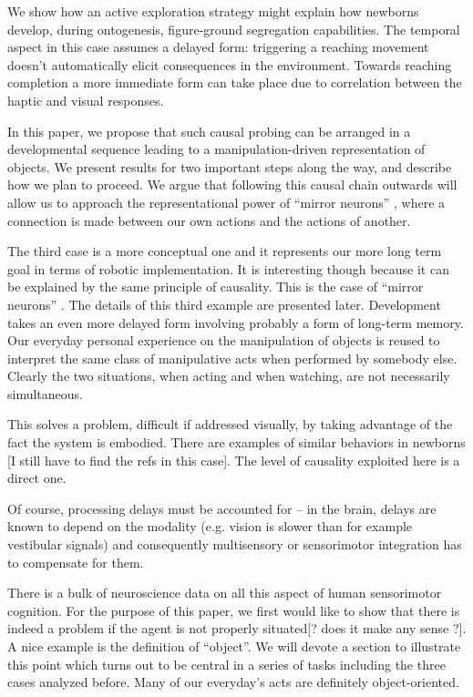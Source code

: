 We
show how an active exploration strategy might explain how newborns
develop, during ontogenesis, figure-ground segregation capabilities.
The temporal aspect in this case assumes a delayed form: triggering a
reaching movement doesn't automatically elicit consequences in the
environment. Towards reaching completion a more immediate form can
take place due to correlation between the haptic and visual responses.
\fi


In this paper, we propose that such causal probing can be arranged in
a developmental sequence leading to a manipulation-driven
representation of objects.  We present results for two important
steps along the way, and describe how we plan to proceed.
We argue that following this causal chain outwards will allow
us to approach the representational power of ``mirror
neurons'' \cite{fadiga00visuomotor}, where a connection is made
between our own actions and the actions of another.

\ifverbose
The third case is a more conceptual one and it represents our more long
term goal in terms of robotic implementation. It is interesting though
because it can be explained by the same principle of causality. This
is the case of ``mirror neurons'' \cite{fadiga00visuomotor}. The
details of this third example are presented later.  Development takes
an even more delayed form involving probably a form of long-term
memory. Our everyday personal experience on the manipulation of objects is
reused to interpret the same class of manipulative acts when performed
by somebody else.  Clearly the two situations, when acting and when watching,
 are not necessarily simultaneous.
\fi

\ifverbose
This solves a problem,
difficult if addressed visually, by taking advantage of the fact the
system is embodied.  There are examples of similar behaviors in
newborns [I still have to find the refs in this case]. The level of
causality exploited here is a direct one. 
\fi

\ifverbose
  Of
course, processing delays must be accounted for -- in the brain,
delays are known to depend on the modality (e.g. vision is slower than
for example vestibular signals) and consequently multisensory or
sensorimotor integration has to compensate for them.
\fi



\ifverbose
There is a bulk of neuroscience data on all this aspect of human
sensorimotor cognition. For the purpose of this paper, we first would
like to show that there is indeed a problem if the agent is not
properly situated[? does it make any sense ?]. A nice example is the
definition of ``object''.  We will devote a
section to illustrate this point which turns out to be central in a
series of tasks including the three cases analyzed before. Many of our everyday's
acts are definitely object-oriented.

